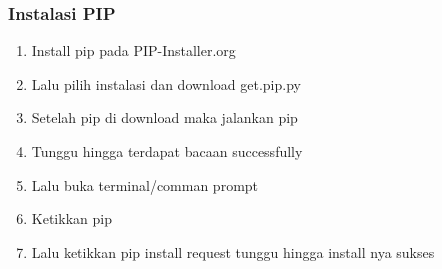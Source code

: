 \documentclass{article}
\begin{document}
\subsubsection{Instalasi PIP}
\begin{enumerate}
\item	Install pip pada PIP-Installer.org
\item	Lalu pilih instalasi dan download get.pip.py
\item	Setelah pip di download maka jalankan pip
\item	Tunggu hingga terdapat bacaan successfully
\item	Lalu buka terminal/comman prompt
\item	Ketikkan pip
\item Lalu ketikkan pip install request tunggu hingga install nya sukses
\end{enumerate}
\end{document}

